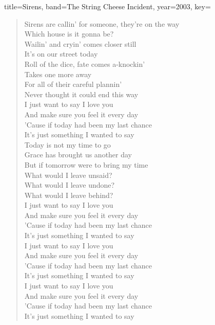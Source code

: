 \documentclass{skrul-leadsheet}
\begin{document}
\begin{song}[transpose-capo=true]{title={Sirens}, band={The String Cheese Incident}, year={2003}, key={}}

\begin{verse}
Sirens are callin' for someone, they're on the way \\
Which house is it gonna be? \\
Wailin' and cryin' comes closer still \\
It's on our street today \\
Roll of the dice, fate comes a-knockin' \\
Takes one more away \\
For all of their careful plannin' \\
Never thought it could end this way \\
I just want to say I love you \\
And make sure you feel it every day \\
'Cause if today had been my last chance \\
It's just something I wanted to say \\
Today is not my time to go \\
Grace has brought us another day \\
But if tomorrow were to bring my time \\
What would I leave unsaid? \\
What would I leave undone? \\
What would I leave behind? \\
I just want to say I love you \\
And make sure you feel it every day \\
'Cause if today had been my last chance \\
It's just something I wanted to say \\
I just want to say I love you \\
And make sure you feel it every day \\
'Cause if today had been my last chance \\
It's just something I wanted to say \\
I just want to say I love you \\
And make sure you feel it every day \\
'Cause if today had been my last chance \\
It's just something I wanted to say
\end{verse}

\end{song}
\end{document}
